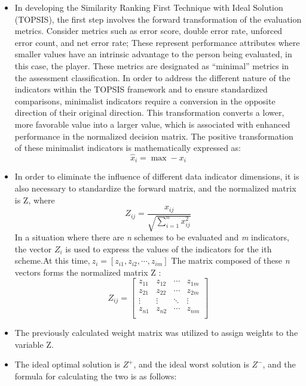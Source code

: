\begin{itemize}
\item In developing the Similarity Ranking First Technique with Ideal Solution (TOPSIS), the first step involves the forward transformation of the evaluation metrics. Consider metrics such as error score, double error rate, unforced error count, and net error rate; These represent performance attributes where smaller values have an intrinsic advantage to the person being evaluated, in this case, the player. These metrics are designated as “minimal” metrics in the assessment classification.
In order to address the different nature of the indicators within the TOPSIS framework and to ensure standardized comparisons, minimalist indicators require a conversion in the opposite direction of their original direction. This transformation converts a lower, more favorable value into a larger value, which is associated with enhanced performance in the normalized decision matrix. The positive transformation of these minimalist indicators is mathematically expressed as:
\begin{equation}
    \hat{x}_{i} = \max - x_{i}
\end{equation}
\item In order to eliminate the influence of different data indicator dimensions, it is also necessary to standardize the forward matrix, and the normalized matrix is Z, where 
\begin{equation}
    Z_{ij} = \frac{x_{ij}}{\sqrt{\sum_{i=1}^{n} x_{ij}^{2}}}
\end{equation}
In a situation where there are\textit{ n }schemes to be evaluated and \textit{m} indicators, the vector \(Z_{i}\) is used to express the values of the indicators for the ith scheme.At this time,$\ z_{i}=[z_{i1},z_{i2},\cdots,z_{im} ]$
The matrix composed of these \textit{n} vectors forms the normalized matrix Z :
 \begin{equation}
 Z_{ij}=
 \left[
 \begin{array}{cccc}
     z_{11}  &z_{12}  &\cdots   &z_{1m} \\
     z_{21}  &z_{22}  &\cdots   &z_{2m} \\
     \vdots   & \vdots  & \ddots & \vdots  \\
     z_{n1}  &z_{n2}  &\cdots   &z_{nm} \\
 \end{array}
 \right]        
 \end{equation}
 \item The previously calculated weight matrix was utilized to assign weights to the variable Z.
 \item The ideal optimal solution is \(Z^{+}\), and the ideal worst solution is \(Z^{-}\), and the formula for calculating the two is as follows:

\end{itemize}
